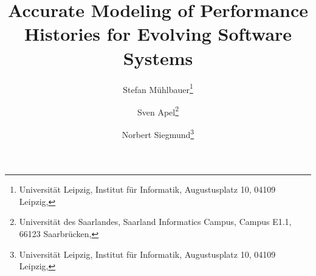\documentclass[english]{lni}
\begin{document}
	
\title[]{Accurate Modeling of Performance Histories for Evolving Software Systems}
\author[Stefan Mühlbauer \and Sven Apel \and Norbert Siegmund]
{Stefan Mühlbauer\footnote{Universität Leipzig, Institut für Informatik, Augustusplatz 10, 04109 Leipzig, } \and
	Sven Apel\footnote{Universität des Saarlandes, Saarland Informatics Campus, Campus E1.1, 66123 Saarbrücken,
		} \and
	Norbert Siegmund\footnote{Universität Leipzig, Institut für Informatik, Augustusplatz 10, 04109 Leipzig, }}
\maketitle

\begin{comment}
\begin{abstract}
This work has been originally published in the proceedings of the 34th IEEE/ACM International Conference on Automated Software Engineering (ASE 2019)~\cite{muehlbauerASE19}.\\
Learning from the history of a software system’s performance behavior does not only help discovering and locating performance bugs, but also supports identifying evolutionary performance patterns and general trends. Exhaustive regression testing is usually impractical, because rigorous performance benchmarking requires executing realistic workloads per revision, resulting in large execution times.\\
We devise a novel active revision sampling approach that aims at tracking and understanding a system’s performance history by approximating the performance behavior of a software system across all of its revisions. In short, we iteratively sample and measure the performance of specific revisions to learn a performance-evolution model. We select revisions based on how uncertainty our models predicts their correspondent performance values. Technically, we use Gaussian Process models that not only estimates performance for each revision, but also provides an uncertainty value alongside. This way, we iteratively improve our model with only few measurements. \\
Our evaluation with six real-world configurable software system demonstrates that Gaussian Process models are able to accurately estimate the performance-evolution histories with only few measurements and to reveal interesting behaviors and trends, such as change points. 
\end{abstract}
\end{comment}
\end{document}
